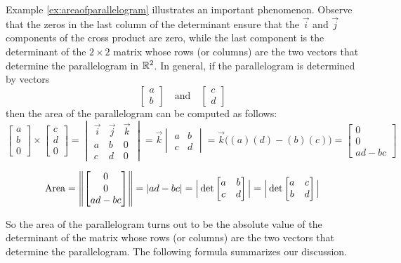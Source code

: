 \documentclass{ximera}
\begin{document}
    Example \ref{ex:areaofparallelogram} illustrates an important phenomenon.  Observe that the zeros in the last column of the determinant ensure that the $\vec{i}$ and $\vec{j}$ components of the cross product are zero, while the last component is the determinant of the $2\times 2$ matrix whose rows (or columns) are the two vectors that determine the parallelogram in $\mathbb{R}^2$.  In general, if the parallelogram is determined by vectors
    $$\begin{bmatrix}a\\b\end{bmatrix}\quad\text{and}\quad\begin{bmatrix}c\\d\end{bmatrix}$$
    then the area of the parallelogram can be computed as follows:
    $$\begin{bmatrix}a\\b\\0\end{bmatrix}\times\begin{bmatrix}c\\d\\0\end{bmatrix}=\begin{vmatrix}\vec{i}&\vec{j}&\vec{k}\\a&b&0\\c&d&0\end{vmatrix}=\vec{k}\begin{vmatrix}a&b\\c&d\end{vmatrix}=\vec{k}\Big((a)(d)-(b)(c)\Big)=\begin{bmatrix}0\\0\\ad-bc\end{bmatrix}$$
     
    $$\mbox{Area}=\left\|\begin{bmatrix}0\\0\\ad-bc\end{bmatrix}\right\|=|ad-bc|=\Big|\det\begin{bmatrix}a&b\\c&d\end{bmatrix}\Big|=\Big|\det\begin{bmatrix}a&c\\b&d\end{bmatrix}\Big|$$
     
    So the area of the parallelogram turns out to be the absolute value of the determinant of the matrix whose rows (or columns) are the two vectors that determine the parallelogram.
    The following formula summarizes our discussion.
     
\end{document}

